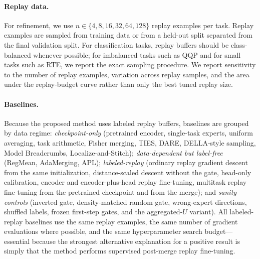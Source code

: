 \documentclass[11pt]{article}
\begin{document}
\paragraph{Replay data.}
For refinement, we use $n \in \{4,8,16,32,64,128\}$ replay examples per task. Replay examples are sampled from training data or from a held-out split separated from the final validation split. For classification tasks, replay buffers should be class-balanced whenever possible; for imbalanced tasks such as QQP and for small tasks such as RTE, we report the exact sampling procedure. We report sensitivity to the number of replay examples, variation across replay samples, and the area under the replay-budget curve rather than only the best tuned replay size.

\paragraph{Baselines.}
Because the proposed method uses labeled replay buffers, baselines are grouped by data regime: \emph{checkpoint-only} (pretrained encoder, single-task experts, uniform averaging, task arithmetic, Fisher merging, TIES, DARE, DELLA-style sampling, Model Breadcrumbs, Localize-and-Stitch); \emph{data-dependent but label-free} (RegMean, AdaMerging, APL); \emph{labeled-replay} (ordinary replay gradient descent from the same initialization, distance-scaled descent without the gate, head-only calibration, encoder and encoder-plus-head replay fine-tuning, multitask replay fine-tuning from the pretrained checkpoint and from the merge); and \emph{sanity controls} (inverted gate, density-matched random gate, wrong-expert directions, shuffled labels, frozen first-step gates, and the aggregated-$U$ variant). All labeled-replay baselines use the same replay examples, the same number of gradient evaluations where possible, and the same hyperparameter search budget---essential because the strongest alternative explanation for a positive result is simply that the method performs supervised post-merge replay fine-tuning.
\end{document}
